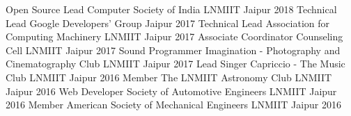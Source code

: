 \begin{cvhonors}
  \cvhonor
    {Open Source Lead}
    {Computer Society of India}
    {LNMIIT Jaipur}
    {2018}
  \cvhonor
    {Technical Lead}
    {Google Developers' Group}
    {Jaipur}
    {2017}
  \cvhonor
    {Technical Lead}
    {Association for Computing Machinery}
    {LNMIIT Jaipur}
    {2017}
  \cvhonor
    {Associate Coordinator}
    {Counseling Cell}
    {LNMIIT Jaipur}
    {2017}
  \cvhonor
    {Sound Programmer}
    {Imagination - Photography and Cinematography Club}
    {LNMIIT Jaipur}
    {2017}
  \cvhonor
    {Lead Singer}
    {Capriccio - The Music Club}
    {LNMIIT Jaipur}
    {2016}
  \cvhonor
    {Member}
    {The LNMIIT Astronomy Club}
    {LNMIIT Jaipur}
    {2016}
  \cvhonor
    {Web Developer}
    {Society of Automotive Engineers}
    {LNMIIT Jaipur}
    {2016}
  \cvhonor
    {Member}
    {American Society of Mechanical Engineers}
    {LNMIIT Jaipur}
    {2016}
\end{cvhonors}
